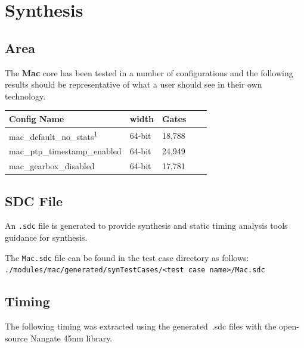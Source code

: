 \section{Synthesis}

\subsection{Area}

The \textbf{Mac} core has been tested in a number of configurations and the
following results should be representative of what a user should see in their
own technology.

\renewcommand*{\arraystretch}{1.4}
\begin{longtable}[H]{
    | p{}
    | p{}
    | p{}
    | p{}
    | p{} |
  }
   \hline
  \textbf{Config Name} &
  \textbf{width}       &
  \textbf{Gates}         \\ \hline \hline
  mac\_default\_no\_stats\textsuperscript{1}  & 
  64-bit              & 
  18,788              \\ \hline

  mac\_ptp\_timestamp\_enabled  & 
  64-bit              & 
  24,949              \\ \hline

  mac\_gearbox\_disabled  & 
  64-bit              & 
  17,781              \\ \hline
\end{longtable}

\subsection{SDC File}
An \texttt{.sdc} file is generated to provide synthesis and static timing
analysis tools guidance for synthesis.

The \texttt{Mac.sdc} file can be found in the test case directory as follows: \\
\texttt{./modules/mac/generated/synTestCases/<test case name>/Mac.sdc}

\subsection{Timing}

The following timing was extracted using the generated~.sdc files with the
open-source Nangate 45nm library.

